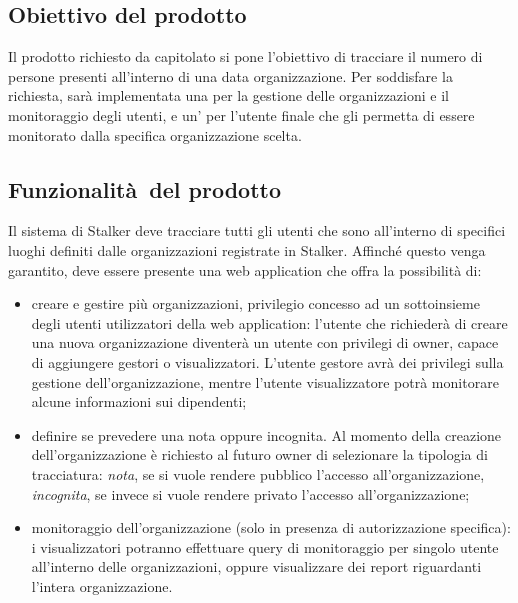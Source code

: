 \documentclass[../analisi-dei-requisiti.tex]{subfiles}
\begin{document}
\subsection{Obiettivo del prodotto}%
\label{sub:obiettivo_del_prodotto}
Il prodotto richiesto da capitolato si pone l'obiettivo di tracciare il numero di persone presenti all'interno di una data organizzazione. Per soddisfare la richiesta, sarà implementata una  per la gestione delle organizzazioni e il monitoraggio degli utenti, e un' per l'utente finale che gli permetta di essere monitorato dalla specifica organizzazione scelta.


\subsection{Funzionalità del prodotto}%
\label{sub:funzionalita_del_prodotto}
Il sistema di Stalker deve tracciare tutti gli utenti che sono all'interno di specifici luoghi definiti dalle organizzazioni registrate in Stalker.
Affinché questo venga garantito, deve essere presente una web application che offra la possibilità di:
\begin{itemize}
  \item creare e gestire più organizzazioni, privilegio concesso ad un sottoinsieme degli utenti utilizzatori della web application: l'utente che richiederà di creare una nuova organizzazione diventerà un utente con privilegi di owner, capace di aggiungere gestori o visualizzatori. L'utente gestore avrà dei privilegi sulla gestione dell'organizzazione, mentre l'utente visualizzatore potrà monitorare alcune informazioni sui dipendenti;
  \item definire se prevedere una  nota oppure incognita. Al momento della creazione dell'organizzazione è richiesto al futuro owner di selezionare la tipologia di tracciatura: \textit{nota}, se si vuole rendere pubblico l'accesso all'organizzazione, \textit{incognita}, se invece si vuole rendere privato l'accesso all'organizzazione;
  \item monitoraggio dell'organizzazione (solo in presenza di autorizzazione specifica): i visualizzatori potranno effettuare query di monitoraggio per singolo utente all'interno delle organizzazioni, oppure visualizzare dei report riguardanti l'intera organizzazione.
\end{itemize}
\end{document}
